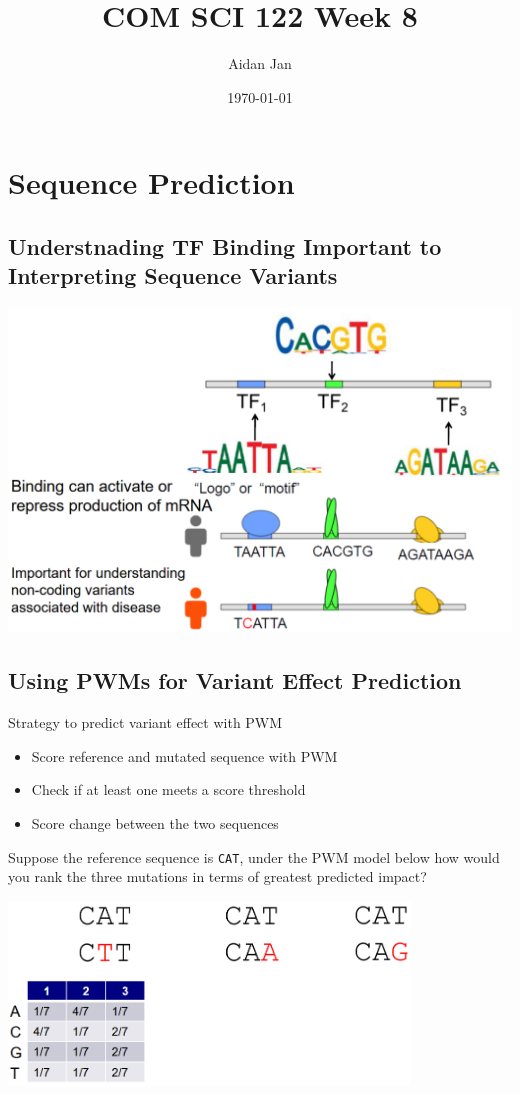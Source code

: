 \documentclass[10pt]{article}
\title{COM SCI 122 Week 8}
\author{Aidan Jan}
\date{\today}
\begin{document}
\maketitle

\section*{Sequence Prediction}
\subsection*{Understnading TF Binding Important to Interpreting Sequence Variants}
\begin{center} 
	\includegraphics*[width=\textwidth]{W8_1.png} 
\end{center}

\subsection*{Using PWMs for Variant Effect Prediction}
Strategy to predict variant effect with PWM
\begin{itemize}
	\item Score reference and mutated sequence with PWM
	\item Check if at least one meets a score threshold
	\item Score change between the two sequences
\end{itemize}
Suppose the reference sequence is \texttt{CAT}, under the PWM model below how would you rank the three mutations in terms of greatest predicted impact?
\begin{center} 
	\includegraphics*[width=0.8\textwidth]{W8_2.png} 
\end{center}
\end{document}
